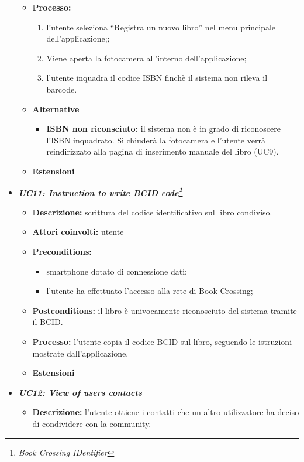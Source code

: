 \begin{itemize}
\begin{itemize}
		\item \textbf{Processo:}
		\begin{enumerate}
			\item l’utente seleziona “Registra un nuovo libro” nel menu principale dell’applicazione;;
			\item Viene aperta la fotocamera all'interno dell'applicazione;
			\item l'utente inquadra il codice ISBN finchè il sistema non rileva il barcode.
		\end{enumerate}
		\item \textbf{Alternative}
		\begin{itemize}
			\item \textbf{ISBN non riconsciuto:} il sistema non è in grado di riconoscere l'ISBN inquadrato. Si chiuderà la fotocamera e l'utente verrà reindirizzato alla pagina di inserimento manuale del libro  (UC9).
		\end{itemize}
		\item \textbf{Estensioni}
	\end{itemize}
	\item \textbf{\textit{UC11: Instruction to write BCID code\footnote{\textit{Book Crossing IDentifier}}}}
	\begin{itemize}
		\item \textbf{Descrizione:} scrittura del codice identificativo sul libro condiviso.
		\item \textbf{Attori coinvolti:} utente
		\item \textbf{Preconditions:}
		\begin{itemize}
			\item smartphone dotato di connessione dati;
			\item l’utente ha effettuato l’accesso alla rete di Book Crossing;
		\end{itemize}
		\item \textbf{Postconditions:} il libro è univocamente riconosciuto del sistema tramite il BCID.
		\item \textbf{Processo:} l'utente copia il codice BCID sul libro, seguendo le istruzioni mostrate dall'applicazione.
		\item \textbf{Estensioni}
	\end{itemize}
	\item \textbf{\textit{UC12: View of users contacts}}
	\begin{itemize}
		\item \textbf{Descrizione:} l'utente ottiene i contatti che un altro utilizzatore ha deciso di condividere con la community.

\end{itemize}
\end{itemize}

